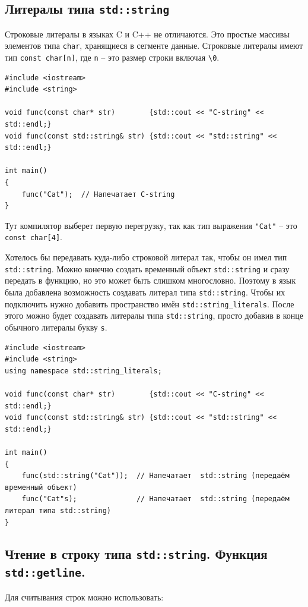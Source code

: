 \documentclass{article}
\begin{document}
\subsection*{Литералы типа \texttt{std::string}}
Строковые литералы в языках C и C++ не отличаются. Это простые массивы элементов типа \texttt{char}, хранящиеся в сегменте данные. Строковые литералы имеют тип \texttt{const char[n]}, где \texttt{n} -- это размер строки включая \texttt{\textbackslash 0}. 
\begin{lstlisting}
#include <iostream>
#include <string>

void func(const char* str)        {std::cout << "C-string" << std::endl;}
void func(const std::string& str) {std::cout << "std::string" << std::endl;}

int main()
{
    func("Cat");  // Напечатает C-string
}
\end{lstlisting}
Тут компилятор выберет первую перегрузку, так как тип выражения \texttt{"Cat"} -- это \texttt{const char[4]}.

Хотелось бы передавать куда-либо строковой литерал так, чтобы он имел тип \texttt{std::string}. Можно конечно создать временный объект \texttt{std::string} и сразу передать в функцию, но это может быть слишком многословно. Поэтому в язык была добавлена возможность создавать литерал типа \texttt{std::string}. Чтобы их подключить нужно добавить пространство имён \texttt{std::string\_literals}. После этого можно будет создавать литералы типа \texttt{std::string}, просто добавив в конце обычного литералы букву \texttt{s}.
\begin{lstlisting}
#include <iostream>
#include <string>
using namespace std::string_literals;

void func(const char* str)        {std::cout << "C-string" << std::endl;}
void func(const std::string& str) {std::cout << "std::string" << std::endl;}

int main()
{
    func(std::string("Cat"));  // Напечатает  std::string (передаём временный объект)
    func("Cat"s);              // Напечатает  std::string (передаём литерал типа std::string)
}
\end{lstlisting}


\subsection*{Чтение в строку типа \texttt{std::string}. Функция \texttt{std::getline}.}
Для считывания строк можно использовать:
\end{document}
